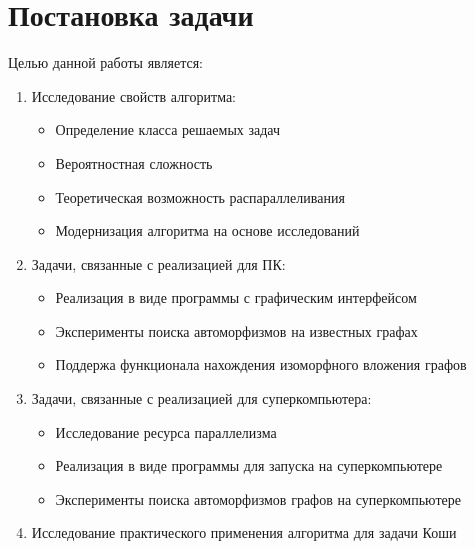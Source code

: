 \section{Постановка задачи}
\label{sec:Problem_1} 
\large

Целью данной работы является:
\begin{enumerate}
\item Исследование свойств алгоритма:
\begin{itemize}
\item Определение класса решаемых задач
\item Вероятностная сложность
\item Теоретическая возможность распараллеливания
\item Модернизация алгоритма на основе исследований
\end{itemize}
\item Задачи, связанные с реализацией для ПК:
\begin{itemize}
\item Реализация в виде программы с графическим интерфейсом
\item Эксперименты поиска автоморфизмов на известных графах
\item Поддержа функционала нахождения изоморфного вложения графов
\end{itemize}
\item Задачи, связанные с реализацией для суперкомпьютера:
\begin{itemize}
\item Исследование ресурса параллелизма
\item Реализация в виде программы для запуска на суперкомпьютере
\item Эксперименты поиска автоморфизмов графов на суперкомпьютере
\end{itemize}
\item Исследование практического применения алгоритма для задачи Коши
\end{enumerate}


